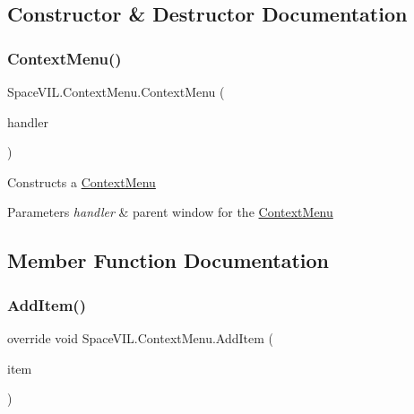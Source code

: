 \subsection{Constructor \& Destructor Documentation}
\mbox{\label{class_space_v_i_l_1_1_context_menu_ab5587faf5fcbe8af55b80295a481bdbc}} 
\subsubsection{\texorpdfstring{Context\+Menu()}{ContextMenu()}}
{\footnotesize\ttfamily Space\+V\+I\+L.\+Context\+Menu.\+Context\+Menu (\begin{DoxyParamCaption}\item[{\mbox{\hyperlink{class_space_v_i_l_1_1_window_layout}{Window\+Layout}}}]{handler }\end{DoxyParamCaption})}



Constructs a \mbox{\hyperlink{class_space_v_i_l_1_1_context_menu}{Context\+Menu}} 


\begin{DoxyParams}{Parameters}
{\em handler} & parent window for the \mbox{\hyperlink{class_space_v_i_l_1_1_context_menu}{Context\+Menu}} \\
\hline
\end{DoxyParams}


\subsection{Member Function Documentation}
\mbox{\label{class_space_v_i_l_1_1_context_menu_a17241424bae3270513087c3adaef5b2e}} 
\subsubsection{\texorpdfstring{Add\+Item()}{AddItem()}}
{\footnotesize\ttfamily override void Space\+V\+I\+L.\+Context\+Menu.\+Add\+Item (\begin{DoxyParamCaption}\item[{\mbox{\hyperlink{interface_space_v_i_l_1_1_core_1_1_i_base_item}{I\+Base\+Item}}}]{item }\end{DoxyParamCaption})\hspace{0.3cm}{\ttfamily [virtual]}}



